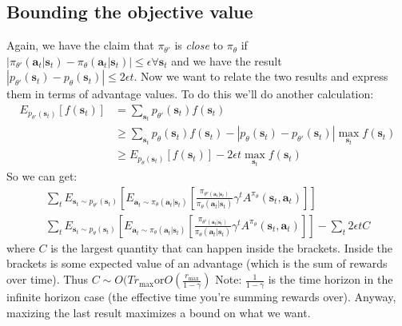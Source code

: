 \documentclass{report}
\begin{document}
\subsection{Bounding the objective value}
Again, we have the claim that 
$ \pi_{ \theta' }  $ is \textit{close} to $ \pi_{ \theta }  $ if $ \left| \pi_{ \theta' } (\bm{a}_{t}| \bm{s}_{t} ) - \pi_{ \theta } (\bm{a}_{t}| \bm{s}_{t} ) \right|
\leq \epsilon \forall \bm{s}_{t} $
and we have the result $ \left| p_{ \theta' } (\bm{s}_{t}) - p_{ \theta } (\bm{s}_{t}) \right| \leq 2 \epsilon t  $.
Now we want to relate the two results and express them in terms of advantage values.
To do this we'll do another calculation:
\begin{align}
		E_{ p_{ \theta' } (\bm{s}_{t}) } \left[ f(\bm{s}_{t}) \right] &=
		\sum_{\bm{s}_{t}}^{} p_{ \theta' } (\bm{s}_{t}) f (\bm{s}_{t}) \\
	  &\geq
		\sum_{\bm{s}_{t}}^{} p_{ \theta } (\bm{s}_{t}) f (\bm{s}_{t}) - \left| p_{ \theta } (\bm{s}_{t}) - p_{ \theta' } (\bm{s}_{t}) \right| \max_{\bm{s}_{t}} f (\bm{s}_{t}) \\
	  &\geq
	  E_{ p_{ \theta } (\bm{s}_{t}) } \left[ f (\bm{s}_{t}) \right] - 2 \epsilon t \max_{\bm{s}_{t}} f (\bm{s}_{t})
\end{align}
So we can get:
\begin{gather}
\sum_{t}^{} E_{ \bm{s}_{t} \sim p_{ \theta' } (\bm{s}_{t}) }
\left[ 
E_{ \bm{a}_{t}\sim \pi_{ \theta } (\bm{a}_{t}| \bm{s}_{t} ) }
\left[ \frac{\pi_{ \theta' (\bm{a}_{t}| \bm{s}_{t} ) }}{\pi_{ \theta }(\bm{a}_{t}| \bm{s}_{t} )} \gamma^{ t }A^{ \pi_{ \theta } } (\bm{s}_{t}, \bm{a}_{t} )  \right] 
\right] \\
\sum_{t}^{} E_{ \bm{s}_{t} \sim p_{ \theta } (\bm{s}_{t}) }
\left[ 
E_{ \bm{a}_{t}\sim \pi_{ \theta } (\bm{a}_{t}| \bm{s}_{t} ) }
\left[ \frac{\pi_{ \theta' (\bm{a}_{t}| \bm{s}_{t} ) }}{\pi_{ \theta }(\bm{a}_{t}| \bm{s}_{t} )} \gamma^{ t }A^{ \pi_{ \theta } } (\bm{s}_{t}, \bm{a}_{t} )  \right] 
\right] 
- \sum_{t}^{} 2 \epsilon t C
\end{gather}
where $ C  $ is the largest quantity that can happen inside the brackets.
Inside the brackets is some expected value of an advantage (which is the sum of rewards over time).
Thus $ C \sim O(T r_{ \text{max} }  \text{or} O(\frac{r_{ \text{max} }}{1 - \gamma} ) $ 
Note: $ \frac{1}{1 - \gamma}   $ is the time horizon in the infinite horizon case (the effective time
you're summing rewards over).
Anyway, maxizing the last result maximizes a bound on what we want.
\end{document}
